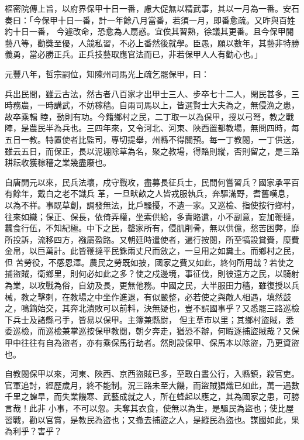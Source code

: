 \begin{pinyinscope}
 樞密院傳上旨，以府界保甲十日一番，慮大促無以精武事，其以一月為一番。安石奏曰：「今保甲十日一番，計一年餘八月當番，若須一月，即番愈疏。又昨與百姓約十日一番，
 今遽改命，恐愈為人扇惑。宜俟其習熟，徐議其更番。且今保甲閱藝八等，勸獎至優，人競私習，不必上番然後就學。臣愚，願以數年，其藝非特勝義勇，當必勝正兵。正兵技藝取應官法而已，非若保甲人人有勸心也。」



 元豐八年，哲宗嗣位，知陳州司馬光上疏乞罷保甲，曰：



 兵出民間，雖云古法，然古者八百家才出甲士三人、步卒七十二人，閑民甚多，三時務農，一時講武，不妨稼穡。自兩司馬以上，皆選賢士大夫為之，無侵漁之患，故卒乘輯
 睦，動則有功。今籍鄉村之民，二丁取一以為保甲，授以弓弩，教之戰陣，是農民半為兵也。三四年來，又令河北、河東、陜西置都教場，無問四時，每五日一教。特置使者比監司，專切提舉，州縣不得關預。每一丁教閱，一丁供送，雖云五日，而保正，長以泥堋除草為名，聚之教場，得賂則縱，否則留之，是三路耕耘收獲稼穡之業幾盡廢也。



 自唐開元以來，民兵法壞，戍守戰攻，盡募長征兵士，民間何嘗習兵？國家承平百有餘年，戴白之老不識兵
 革，一旦畎畝之人皆戎服執兵，奔驅滿野，耆舊嘆息，以為不祥。事既草創，調發無法，比戶騷擾，不遺一家。又巡檢、指使按行鄉村，往來如織；保正、保長，依倚弄權，坐索供給，多責賂遺，小不副意，妄加鞭撻，蠶食行伍，不知紀極。中下之民，罄家所有，侵肌削骨，無以供億，愁苦困弊，靡所投訴，流移四方，襁屬盈路。又朝廷時遣使者，遍行按閱，所至犒設賞賚，糜費金帛，以巨萬計。此皆鞭撻平民銖兩丈尺而斂之，一旦用之如糞土。而鄉村之民，但
 苦勞役，不感恩澤。農民之勞既如披，國家之費又如此，終何所用哉？若使之捕盜賊，衛鄉里，則何必如此之多？使之戍邊境，事征伐，則彼遠方之民，以騎射為業，以攻戰為俗，自幼及長，更無他務。中國之民，大半服田力穡，雖復授以兵械，教之擊刺，在教場之中坐作進退，有似嚴整，必若使之與敵人相遇，填然鼓之，鳴鏑始交，其奔北潰敗可以前料，決無疑也，豈不誤國事乎？又悉罷三路巡檢下兵士及諸縣弓手，皆易以保甲。主簿兼縣尉，
 但主草市以里；其鄉村盜賊，悉委巡檢，而巡檢兼掌巡按保甲教閱，朝夕奔走，猶恐不辦，何暇逐捕盜賊哉？又保甲中往往有自為盜者，亦有乘保馬行劫者。然則設保甲、保馬本以除盜，乃更資盜也。



 自教閱保甲以來，河東、陜西、京西盜賊已多，至敢白晝公行，入縣鎮，殺官吏。官軍追討，經歷歲月，終不能制。況三路未至大饑，而盜賊猖熾已如此，萬一遇數千里之蝗旱，而失業饑寒、武藝成就之人，所在蜂起以應之，其為國家之患，可勝言哉！此非
 小事，不可以忽。夫奪其衣食，使無以為生，是驅民為盜也；使比屋習戰，勸以官賞，是教民為盜也；又撤去捕盜之人，是縱民為盜也。謀國如此，果為利乎？害乎？




\end{pinyinscope}
